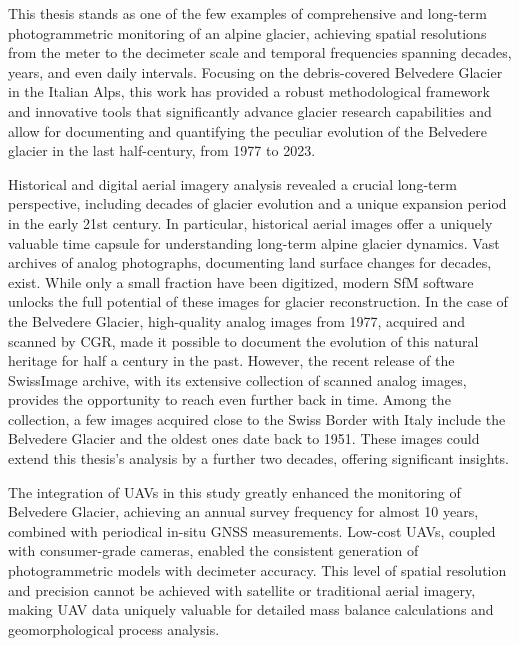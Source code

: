 This thesis stands as one of the few examples of comprehensive and long-term photogrammetric monitoring of an alpine glacier, achieving spatial resolutions from the meter to the decimeter scale and temporal frequencies spanning decades, years, and even daily intervals.
Focusing on the debris-covered Belvedere Glacier in the Italian Alps, this work has provided a robust methodological framework and innovative tools that significantly advance glacier research capabilities and allow for documenting and quantifying the peculiar evolution of the Belvedere glacier in the last half-century, from 1977 to 2023.

Historical and digital aerial imagery analysis revealed a crucial long-term perspective, including decades of glacier evolution and a unique expansion period in the early 21st century. 
In particular, historical aerial images offer a uniquely valuable time capsule for understanding long-term alpine glacier dynamics.  
Vast archives of analog photographs, documenting land surface changes for decades, exist.  
While only a small fraction have been digitized, modern SfM software unlocks the full potential of these images for glacier reconstruction. 
In the case of the Belvedere Glacier, high-quality analog images from 1977, acquired and scanned by CGR, made it possible to document the evolution of this natural heritage for half a century in the past. 
However, the recent release of the SwissImage archive, with its extensive collection of scanned analog images, provides the opportunity to reach even further back in time. 
Among the collection, a few images acquired close to the Swiss Border with Italy include the Belvedere Glacier and the oldest ones date back to 1951.
These images could extend this thesis's analysis by a further two decades, offering significant insights.

The integration of UAVs in this study greatly enhanced the monitoring of Belvedere Glacier, achieving an annual survey frequency for almost 10 years, combined with periodical in-situ GNSS measurements. 
Low-cost UAVs, coupled with consumer-grade cameras, enabled the consistent generation of photogrammetric models with decimeter accuracy. 
This level of spatial resolution and precision cannot be achieved with satellite or traditional aerial imagery, making UAV data uniquely valuable for detailed mass balance calculations and geomorphological process analysis.

